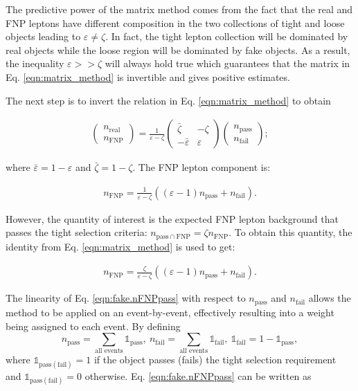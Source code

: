 The predictive power of the matrix method comes from the fact that 
the real and FNP leptons have different composition in the two collections 
of tight and loose objects leading to $\varepsilon \neq \zeta$. In fact, 
the tight lepton collection will be dominated by real objects while the 
loose region will be dominated by fake objects. As a result, 
the inequality $\varepsilon >> \zeta$ will always hold true which 
guarantees that the matrix in Eq. \ref{eqn:matrix_method} is invertible 
and gives positive estimates. 

The next step is to invert the relation in Eq. \ref{eqn:matrix_method} to 
obtain

\begin{align}
\begin{pmatrix}n_\text{real}\\n_\text{FNP}\end{pmatrix} 
= \frac{1}{\varepsilon - \zeta} \begin{pmatrix}\bar\zeta & -\zeta\\ -\bar\varepsilon & \varepsilon\end{pmatrix}
\begin{pmatrix}n_\text{pass}\\n_\text{fail}\end{pmatrix}; 
\label{eqn:fake.inv_matrix_method}
\end{align}

where $\bar\varepsilon = 1 - \varepsilon$ and  $\bar\zeta = 1 - \zeta$. 
The FNP lepton component is: 

\begin{align}
n_\text{FNP} = \frac{1}{\varepsilon - \zeta}\left(\left(\varepsilon-1\right)n_\text{pass}+n_\text{fail}\right).
\label{eqn:fake.nfake}
\end{align}

However, the quantity of interest is the expected FNP lepton background that 
passes the tight selection criteria: 
$n_{\text{pass}~\cap~\text{FNP}} = \zeta n_\text{FNP}$.
 To obtain this quantity, 
the identity from Eq. \ref{eqn:matrix_method} is used to get:

\begin{align}
n_\text{FNP} = \frac{\zeta}{\varepsilon - \zeta}\left(\left(\varepsilon-1\right)n_\text{pass}+n_\text{fail}\right).
\label{eqn:fake.nFNPpass}
\end{align}

The linearity of Eq. \ref{eqn:fake.nFNPpass}  with respect to $n_\text{pass}$ 
and $n_\text{fail}$ allows the method to be applied on an event-by-event, 
effectively resulting into a weight being assigned to each event. 
By defining
\[
  n_\text{pass} = \sum_\text{all events} \mathbb{1}_\text{pass},~
  n_\text{fail} = \sum_\text{all events} \mathbb{1}_\text{fail},~ 
  \mathbb{1}_\text{fail} = 1 -  \mathbb{1}_\text{pass},
\]
where $\mathbb{1}_{\text{pass} \left(\text{fail}\right)} = 1$ if the object passes 
(fails) the tight selection requirement and $\mathbb{1}_{\text{pass}\left(\text{fail}\right)} = 0$ otherwise. Eq. \ref{eqn:fake.nFNPpass} can be written as


